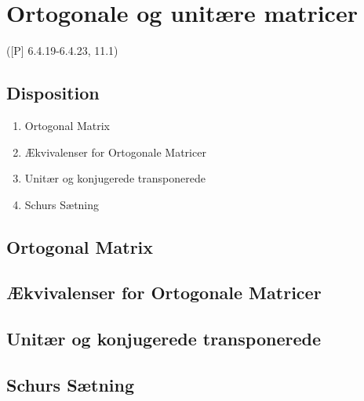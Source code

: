 \newpage
\chapter{Ortogonale og unitære matricer}
([P] 6.4.19-6.4.23, 11.1)

\section*{Disposition}
\begin{enumerate}
	\item Ortogonal Matrix
	\item Ækvivalenser for Ortogonale Matricer
	\item Unitær og konjugerede transponerede
	\item Schurs Sætning
\end{enumerate}

\section{Ortogonal Matrix}


\section{Ækvivalenser for Ortogonale Matricer}


\section{Unitær og konjugerede transponerede}



\section{Schurs Sætning}


